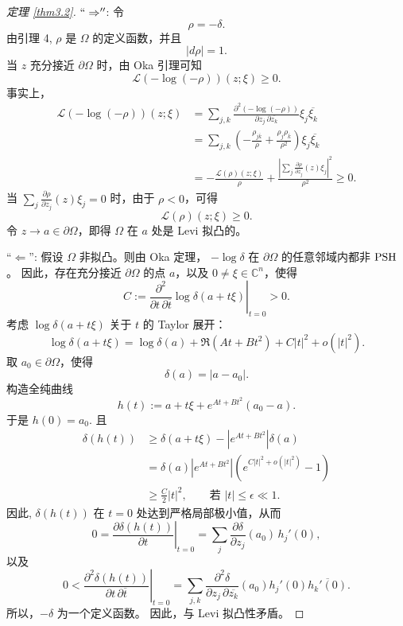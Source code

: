 \begin{proof}[定理 \ref{thm3.2}]
$``\Rightarrow ''$:     
令
\[
\rho=-\delta.
\]
由引理 4, \(\rho\) 是 \(\Omega\) 的定义函数，并且
\[
|d\rho|=1.
\]
当 \(z\) 充分接近 \(\partial\Omega\) 时，由 Oka 引理可知
\[
\mathcal{L}(-\log(-\rho))(z;\xi)\geq 0.
\]
事实上，
\begin{align*}
\mathcal{L}(-\log(-\rho))(z;\xi)
&=
\sum_{j,k}
\frac{\partial^2(-\log(-\rho))}
     {\partial z_j\,\partial\overline{z_k}}
\xi_j\overline{\xi_k} \\
&=
\sum_{j,k}
\left(
-\frac{\rho_{j\overline{k}}}{\rho}
+
\frac{\rho_j\rho_{\overline{k}}}{\rho^2}
\right)
\xi_j\overline{\xi_k} \\
&=
-\frac{\mathcal{L}(\rho )(z;\xi)}{\rho}
+
\frac{
\left|
\displaystyle\sum_j
\frac{\partial\rho}{\partial z_j}(z)\xi_j
\right|^2
}{\rho^2}
\geq 0.
\end{align*}
当
\(
\sum_j
\frac{\partial\rho}{\partial z_j}(z)\xi_j=0
\)
时，由于 \(\rho<0\)，可得
\[
\mathcal{L}(\rho )(z;\xi)\geq 0.
\]
令 \(z\to a\in\partial\Omega\)，即得 \(\Omega\) 在 \(a\) 处是
Levi 拟凸的。

``\(\Leftarrow\)'':
假设 \(\Omega\) 非拟凸。则由 Oka 定理，
\(
-\log\delta
\)
在 \(\partial\Omega\) 的任意邻域内都非 $\operatorname{PSH}$。
因此，存在充分接近 \(\partial\Omega\) 的点 \(a\)，以及
\(0\neq \xi\in\mathbb{C}^n\)，使得
\[
C
:=
\left.
\frac{\partial^2}{\partial t\,\partial\overline{t}}
\log\delta(a+t\xi)
\right|_{t=0}
>0.
\]
考虑 \(\log\delta(a+t\xi)\) 关于 \(t\) 的 Taylor 展开：
\[
\log\delta(a+t\xi)
=
\log\delta(a)
+
\Re\!\left(At+Bt^2\right)
+
C|t|^2
+
o(|t|^2).
\]
取 \(a_0\in\partial\Omega\)，使得
\[
\delta(a)=|a-a_0|.
\]
构造全纯曲线
\[
h(t)
:=
a+t\xi
+
e^{At+Bt^2}(a_0-a).
\]
于是
\(
h(0)=a_0.
\)
且
\begin{align*}
\delta(h(t))
&\geq
\delta(a+t\xi)
-
\left|e^{At+Bt^2}\right|\delta(a) \\
&=
\delta(a)\left|e^{At+Bt^2}\right|
\left(
e^{C|t|^2+o(|t|^2)}-1
\right) \\
&\geq
\frac{C}{2}|t|^2,
\qquad \text{若 } |t| \leq \epsilon  \ll 1.
\end{align*}
因此, \(\delta(h(t))\) 在 \(t=0\) 处达到严格局部极小值，从而
\[
0
=
\left.
\frac{\partial \delta(h(t))}{\partial t}
\right|_{t=0}
=
\sum_j
\frac{\partial \delta}{\partial z_j}(a_0)\,
h_j'(0),
\]
以及
\[
0<
\left.
\frac{\partial^2 \delta(h(t))}
{\partial t\,\partial\overline{t}}
\right|_{t=0}
=
\sum_{j,k}
\frac{\partial^2\delta}
{\partial z_j\,\partial\overline{z_k}}(a_0)
h_j'(0)\overline{h_k'(0)}.
\]
所以，\(-\delta\) 为一个定义函数。
因此，与 Levi 拟凸性矛盾。
\end{proof}

